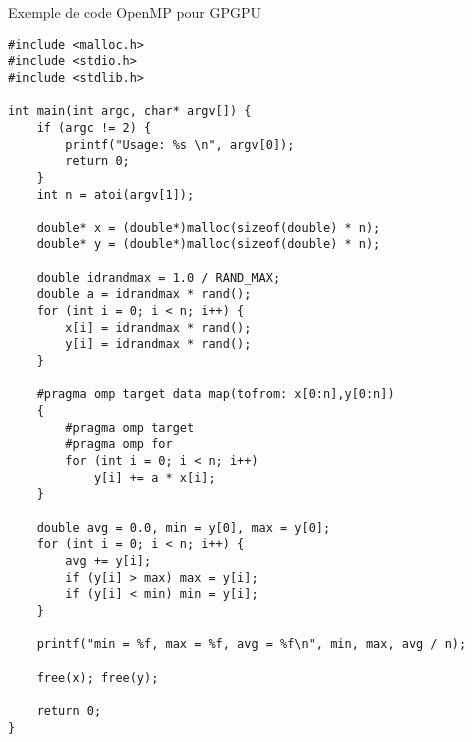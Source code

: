 \documentclass[handout,francais]{beamer}
\begin{document}
\begin{frame}[fragile]{Exemple de code OpenMP pour GPGPU}
\begin{lstlisting}
#include <malloc.h>
#include <stdio.h>
#include <stdlib.h>
 
int main(int argc, char* argv[]) {
    if (argc != 2) {
        printf("Usage: %s \n", argv[0]);
        return 0;
    }     
    int n = atoi(argv[1]);
     
    double* x = (double*)malloc(sizeof(double) * n);
    double* y = (double*)malloc(sizeof(double) * n);
 
    double idrandmax = 1.0 / RAND_MAX;
    double a = idrandmax * rand();
    for (int i = 0; i < n; i++) {
        x[i] = idrandmax * rand();
        y[i] = idrandmax * rand();
    }
 
    #pragma omp target data map(tofrom: x[0:n],y[0:n])
    {
        #pragma omp target
        #pragma omp for
        for (int i = 0; i < n; i++)
            y[i] += a * x[i];
    }
     
    double avg = 0.0, min = y[0], max = y[0];
    for (int i = 0; i < n; i++) {
        avg += y[i];
        if (y[i] > max) max = y[i];
        if (y[i] < min) min = y[i];
    }
     
    printf("min = %f, max = %f, avg = %f\n", min, max, avg / n);
     
    free(x); free(y);
 
    return 0;
}
\end{lstlisting}
\end{frame}
\end{document}
